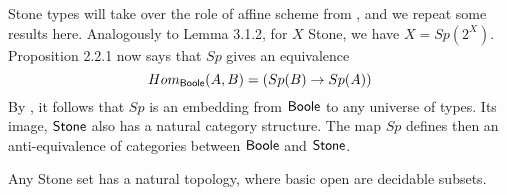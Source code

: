 Stone types will take over the role of affine scheme from \cite{draft}, 
and we repeat some results here. 
Analogously to Lemma 3.1.2, 
for $X$ Stone, we have $X = Sp(2^X)$. 
%
Proposition 2.2.1 now says that 
$Sp$ gives an equivalence 
\begin{equation}
   Hom_{\mathsf{Boole}} (A, B) = (Sp(B) \to Sp(A))
\end{equation}
By \cite{HoTT, p TODO}, it follows that 
$Sp$ is an embedding from $\mathsf{Boole}$ to any universe of types.
Its image, $\mathsf{Stone}$ also has a natural category structure.
The map $Sp$ defines then an anti-equivalence of categories between $\mathsf{Boole}$ and $\mathsf{Stone}$.



  

%


Any Stone set has a natural topology, where basic open are decidable subsets.

